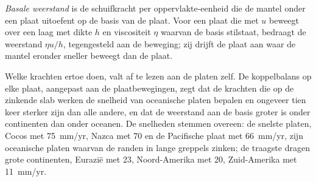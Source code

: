 \begin{omfigure}

\par{}\label{fig:b3:mantle-convection:ridge-push}
\end{omfigure}

\begin{definition}\label{def:b3:mantle-convection:basal-drag}
\emph{Basale weerstand} is de schuifkracht per oppervlakte-eenheid die de
mantel onder een plaat uitoefent op de basis van de plaat. Voor een plaat die met $u$ beweegt
over een laag met dikte $h$ en viscositeit $\eta$ waarvan de basis stilstaat, bedraagt de
weerstand $\eta u/h$, tegengesteld aan de beweging; zij drijft de plaat aan waar de mantel
eronder sneller beweegt dan de plaat.
\end{definition}

Welke krachten ertoe doen, valt af te lezen aan de platen zelf. De koppelbalans
op elke plaat, aangepast aan de plaatbewegingen, zegt dat de krachten die op de
zinkende slab werken de snelheid van oceanische platen bepalen en ongeveer tien keer
sterker zijn dan alle andere, en dat de weerstand aan de basis groter is onder
continenten dan onder oceanen. De snelheden stemmen overeen: de snelste platen, Cocos met
\qty{75}{mm/yr}, Nazca met 70 en de Pacifische plaat met \qty{66}{mm/yr}, zijn oceanische
platen waarvan de randen in lange greppels zinken; de traagste dragen grote continenten,
Eurazië met 23, Noord-Amerika met 20, Zuid-Amerika met \qty{11}{mm/yr}.

